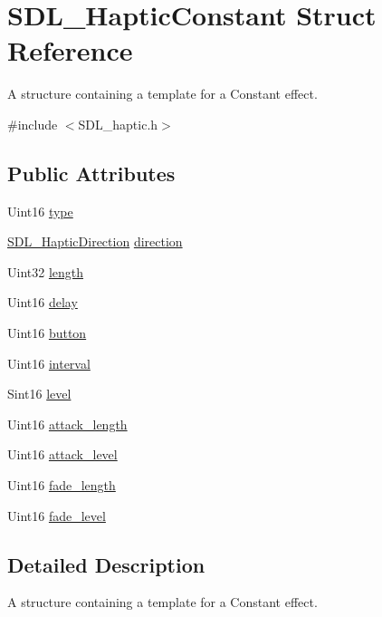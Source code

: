 \hypertarget{structSDL__HapticConstant}{\section{S\+D\+L\+\_\+\+Haptic\+Constant Struct Reference}
\label{structSDL__HapticConstant}
}


A structure containing a template for a Constant effect.  




{\ttfamily \#include $<$S\+D\+L\+\_\+haptic.\+h$>$}

\subsection*{Public Attributes}
\begin{DoxyCompactItemize}
\item 
Uint16 \hyperlink{structSDL__HapticConstant_a5cb31202803a8bc1be95fcede5ac8afb}{type}
\item 
\hyperlink{structSDL__HapticDirection}{S\+D\+L\+\_\+\+Haptic\+Direction} \hyperlink{structSDL__HapticConstant_a3e871debf4e57c35960f019d2605d84f}{direction}
\item 
Uint32 \hyperlink{structSDL__HapticConstant_aeb994c356b1d236b060f277d157e98ec}{length}
\item 
Uint16 \hyperlink{structSDL__HapticConstant_a16a751009893f5412201e3ce91146b25}{delay}
\item 
Uint16 \hyperlink{structSDL__HapticConstant_aa65321f1b002adaab6e629d5bed556e9}{button}
\item 
Uint16 \hyperlink{structSDL__HapticConstant_ab1f7f0df856f4cf1fdf937cb886226b4}{interval}
\item 
Sint16 \hyperlink{structSDL__HapticConstant_a5b095eea77464623ed57af15f29f4ca6}{level}
\item 
Uint16 \hyperlink{structSDL__HapticConstant_a907bade68ab53fb24e7d2651d19b767f}{attack\+\_\+length}
\item 
Uint16 \hyperlink{structSDL__HapticConstant_a0928a37f3fab0e5b7daffc7a1d65744c}{attack\+\_\+level}
\item 
Uint16 \hyperlink{structSDL__HapticConstant_a647a6b761ac6ba16160d0892a12806bc}{fade\+\_\+length}
\item 
Uint16 \hyperlink{structSDL__HapticConstant_a49f6499c89f3e494efbe92f12277c949}{fade\+\_\+level}
\end{DoxyCompactItemize}


\subsection{Detailed Description}
A structure containing a template for a Constant effect. 

